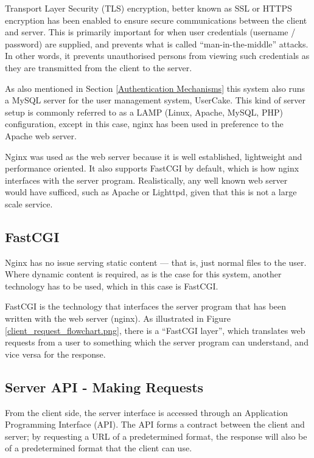Transport Layer Security (TLS) encryption, better known as SSL or HTTPS encryption has been enabled to ensure secure communications between the client and server. This is primarily important for when user credentials (username / password) are supplied, and prevents what is called ``man-in-the-middle'' attacks. In other words, it prevents unauthorised persons from viewing such credentials as they are transmitted from the client to the server. 

As also mentioned in Section \ref{Authentication Mechanisms} this system also runs a MySQL server for the user management system, UserCake. This kind of server setup is commonly referred to as a LAMP (Linux, Apache, MySQL, PHP) configuration\cite{lamp}, except in this case, nginx has been used in preference to the Apache web server. 

Nginx was used as the web server because it is well established, lightweight and performance oriented. It also supports FastCGI by default, which is how nginx interfaces with the server program. Realistically, any well known web server would have sufficed, such as Apache or Lighttpd, given that this is not a large scale service.

\subsection{FastCGI}

Nginx has no issue serving static content --- that is, just normal files to the user. Where dynamic content is required, as is the case for this system, another technology has to be used, which in this case is FastCGI.

FastCGI is the technology that interfaces the server program that has been written with the web server (nginx). As illustrated in Figure \ref{client_request_flowchart.png}, there is a ``FastCGI layer'', which translates web requests from a user to something which the server program can understand, and vice versa for the response. 

\subsection{Server API - Making Requests}\label{API}

From the client side, the server interface is accessed through an Application Programming Interface (API). The API forms a contract between the client and server; by requesting a URL of a predetermined format, the response will also be of a predetermined format that the client can use.

